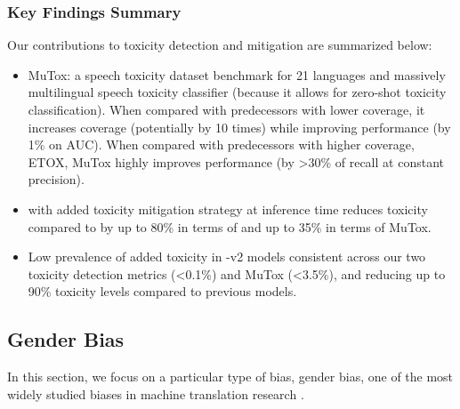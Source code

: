 \subsubsection{Key Findings Summary}

Our contributions to toxicity detection and mitigation are summarized below:

\begin{itemize}
    \item MuTox: a speech toxicity dataset benchmark for 21 languages and massively multilingual speech toxicity classifier (because it allows for zero-shot toxicity classification). When compared with predecessors with lower coverage, it increases coverage (potentially by 10 times) while improving performance (by 1\% on AUC). When compared with predecessors with higher coverage, ETOX, MuTox highly improves performance (by >30\% of recall at constant precision).
    \item \mfourttwo with added toxicity mitigation strategy at inference time reduces toxicity compared to \mfourtlg by up to 80\% in terms of \etox and up to 35\% in terms of MuTox.
    \item Low prevalence of added toxicity in \mfourtlg-v2 models consistent across our two toxicity detection metrics \etox (<0.1\%) and MuTox (<3.5\%), and reducing up to 90\% toxicity levels compared to previous \mfourtlg models.
\end{itemize}


\subsection{Gender Bias}

In this section, we focus on a particular type of bias, gender bias, one of the most widely studied biases in machine translation research \citep{costajussa:nature:2019, savoldi:2021, costajussaetal:2022aaai, escude-font-costa-jussa-2019-equalizing, stanovsky-etal-2019-evaluating}.

